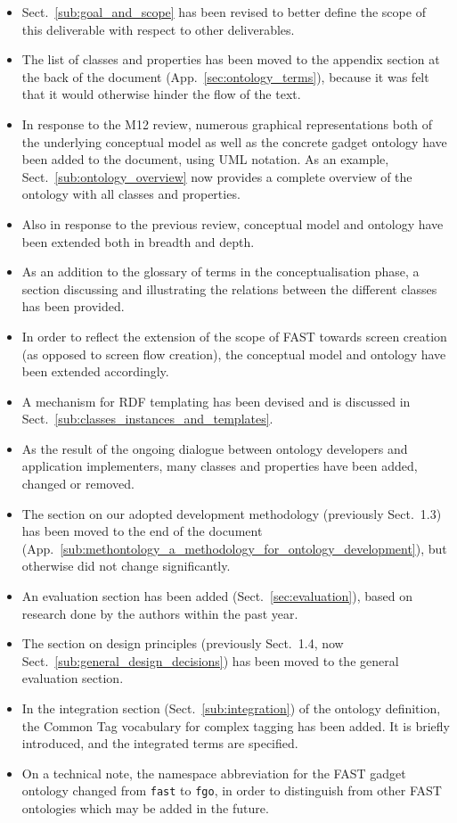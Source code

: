 \documentclass{article}
\begin{document}
\begin{itemize}
	\item Sect.~\ref{sub:goal_and_scope} has been revised to better define the scope of this deliverable with respect to other deliverables.
	\item The list of classes and properties has been moved to the appendix section at the back of the document (App.~\ref{sec:ontology_terms}), because it was felt that it would otherwise hinder the flow of the text.
	\item In response to the M12 review, numerous graphical representations both of the underlying conceptual model as well as the concrete gadget ontology have been added to the document, using UML notation. As an example, Sect.~\ref{sub:ontology_overview} now provides a complete overview of the ontology with all classes and properties.
	\item Also in response to the previous review, conceptual model and ontology have been extended both in breadth and depth.
	\item As an addition to the glossary of terms in the conceptualisation phase, a section discussing and illustrating the relations between the different classes has been provided.
	\item In order to reflect the extension of the scope of FAST towards screen creation (as opposed to screen flow creation), the conceptual model and ontology have been extended accordingly.
	\item A mechanism for RDF templating has been devised and is discussed in Sect.~\ref{sub:classes_instances_and_templates}.
	\item As the result of the ongoing dialogue between ontology developers and application implementers, many classes and properties have been added, changed or removed.
	\item The section on our adopted development methodology (previously Sect.~1.3) has been moved to the end of the document (App.~\ref{sub:methontology_a_methodology_for_ontology_development}), but otherwise did not change significantly.
	\item An evaluation section has been added (Sect.~\ref{sec:evaluation}), based on research done by the authors within the past year.
	\item The section on design principles (previously Sect.~1.4, now Sect.~\ref{sub:general_design_decisions}) has been moved to the general evaluation section.
	\item In the integration section (Sect.~\ref{sub:integration}) of the ontology definition, the Common Tag vocabulary for complex tagging has been added. It is briefly introduced, and the integrated terms are specified.
	\item On a technical note, the namespace abbreviation for the FAST gadget ontology changed from \texttt{fast} to \texttt{fgo}, in order to distinguish from other FAST ontologies which may be added in the future.
\end{itemize}



\singlespacing
\clearpage
{}


\end{document}
